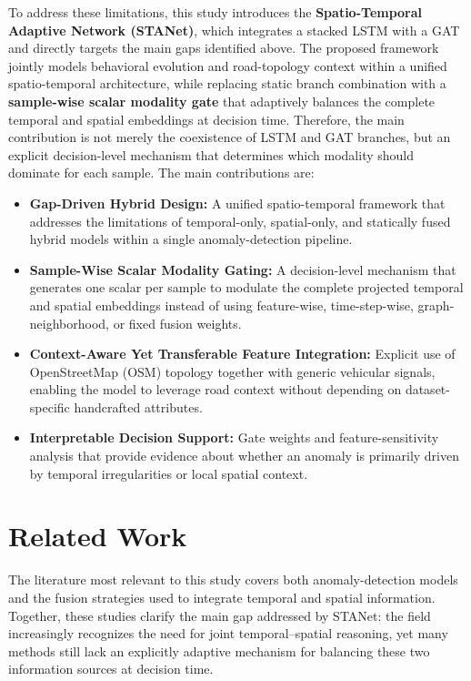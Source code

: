 \documentclass[journal]{IEEEtran}
\begin{document}
To address these limitations, this study introduces the \textbf{Spatio-Temporal Adaptive Network (STANet)}, which integrates a stacked LSTM with a GAT and directly targets the main gaps identified above. The proposed framework jointly models behavioral evolution and road-topology context within a unified spatio-temporal architecture, while replacing static branch combination with a \textbf{sample-wise scalar modality gate} that adaptively balances the complete temporal and spatial embeddings at decision time. Therefore, the main contribution is not merely the coexistence of LSTM and GAT branches, but an explicit decision-level mechanism that determines which modality should dominate for each sample. The main contributions are:
\begin{itemize}
  \item \textbf{Gap-Driven Hybrid Design:} A unified spatio-temporal framework that addresses the limitations of temporal-only, spatial-only, and statically fused hybrid models within a single anomaly-detection pipeline.
  \item \textbf{Sample-Wise Scalar Modality Gating:} A decision-level mechanism that generates one scalar per sample to modulate the complete projected temporal and spatial embeddings instead of using feature-wise, time-step-wise, graph-neighborhood, or fixed fusion weights.
  \item \textbf{Context-Aware Yet Transferable Feature Integration:} Explicit use of OpenStreetMap (OSM) topology together with generic vehicular signals, enabling the model to leverage road context without depending on dataset-specific handcrafted attributes.
  \item \textbf{Interpretable Decision Support:} Gate weights and feature-sensitivity analysis that provide evidence about whether an anomaly is primarily driven by temporal irregularities or local spatial context.
\end{itemize}

\section{Related Work}
The literature most relevant to this study covers both anomaly-detection models and the fusion strategies used to integrate temporal and spatial information. Together, these studies clarify the main gap addressed by STANet: the field increasingly recognizes the need for joint temporal--spatial reasoning, yet many methods still lack an explicitly adaptive mechanism for balancing these two information sources at decision time.
\end{document}
